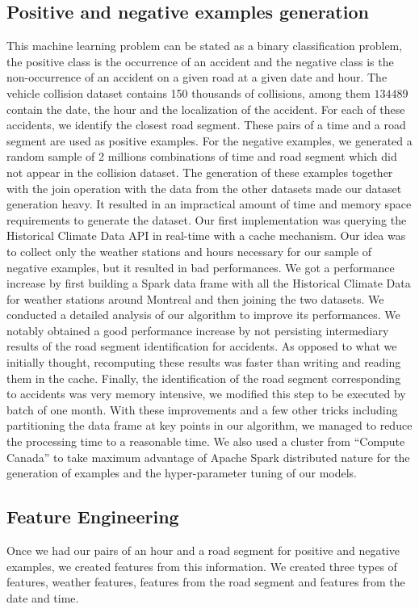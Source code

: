 \documentclass[conference]{IEEEtran}
\begin{document}
\subsection{Positive and negative examples generation}
This machine learning problem can be stated as a binary classification problem, the positive class is the occurrence of an accident and the negative class is the non-occurrence of an accident on a given road at a given date and hour. The vehicle collision dataset contains 150 thousands of collisions, among them $134 489$ contain the date, the hour and the localization of the accident. For each of these accidents, we identify the closest road segment. These pairs of a time and a road segment are used as positive examples. For the negative examples, we generated a random sample of 2 millions combinations of time and road segment which did not appear in the collision dataset.  The generation of these examples together with the join operation with the data from the other datasets made our dataset generation heavy. It resulted in an impractical amount of time and memory space requirements to generate the dataset. Our first implementation was querying the Historical Climate Data API in real-time with a cache mechanism. Our idea was to collect only the weather stations and hours necessary for our sample of negative examples, but it resulted in bad performances. We got a performance increase by first building a Spark data frame with all the Historical Climate Data for weather stations around Montreal and then joining the two datasets. We conducted a detailed analysis of our algorithm to improve its performances. We notably obtained a good performance increase by not persisting intermediary results of the road segment identification for accidents. As opposed to what we initially thought, recomputing these results was faster than writing and reading them in the cache. Finally, the identification of the road segment corresponding to accidents was very memory intensive, we modified this step to be executed by batch of one month.  With these improvements and a few other tricks including partitioning the data frame at key points in our algorithm, we managed to reduce the processing time to a reasonable time. We also used a cluster from “Compute Canada” to take maximum advantage of Apache Spark distributed nature for the generation of examples and the hyper-parameter tuning of our models.

\subsection{Feature Engineering}
Once we had our pairs of an hour and a road segment for positive and negative examples, we created features from this information. We created three types of features, weather features, features from the road segment and features from the date and time.
\end{document}
